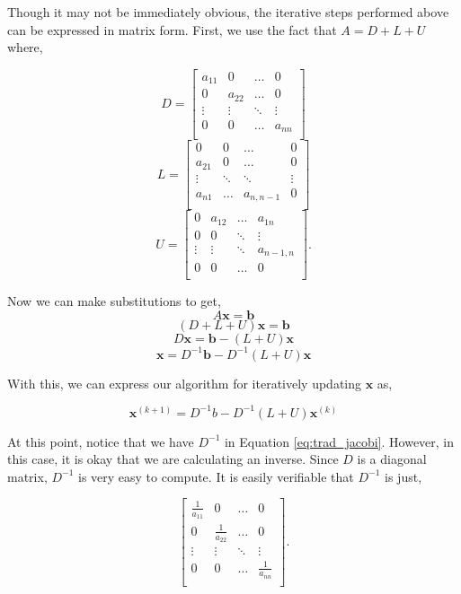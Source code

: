 Though it may not be immediately obvious, the iterative steps performed above
can be expressed in matrix form. First, we use the fact that
$A = D + L + U$ where,

$$
D = \begin{bmatrix}
a_{11} & 0 & \ldots & 0 \\
0 & a_{22} & \ldots & 0 \\
 \vdots & \vdots & \ddots & \vdots \\
0 & 0 & \ldots & a_{nn} \\
\end{bmatrix}
$$
$$
L = \begin{bmatrix}
0 & 0 & \ldots & 0 \\
a_{21} &  0 & \ldots & 0\\
 \vdots & \ddots & \ddots & \vdots \\
a_{n1} & \ldots & a_{n,n-1} & 0 \\
\end{bmatrix}
$$
$$
U = \begin{bmatrix}
0 & a_{12} & \ldots & a_{1n} \\
0 & 0 & \ddots & \vdots \\
 \vdots & \vdots & \ddots & a_{n-1,n} \\
0 & 0 & \ldots & 0 \\
\end{bmatrix}.
$$

Now we can make substitutions to get,
$$ A\mathbf{x} = \mathbf{b} $$
$$ (D + L + U)\mathbf{x} = \mathbf{b} $$
$$ D\mathbf{x} = \mathbf{b} - (L+U)\mathbf{x} $$
$$ \mathbf{x} = D^{-1}\mathbf{b} - D^{-1}(L+U)\mathbf{x} $$

With this, we can express our algorithm for iteratively updating $\mathbf{x}$ as,

\begin{equation} \label{eq:trad_jacobi}
\mathbf{x}^{(k+1)} = D^{-1}b - D^{-1}(L+U)\mathbf{x}^{(k)}
\end{equation}

At this point, notice that we have $D^{-1}$ in Equation \ref{eq:trad_jacobi}. However, in
this case, it is okay that we are calculating an inverse. Since $D$ is a diagonal
matrix, $D^{-1}$ is very easy to compute. It is easily verifiable that $D^{-1}$
is just,

$$
\begin{bmatrix}
\frac{1}{a_{11}} & 0 & \ldots & 0 \\
0 & \frac{1}{a_{22}} & \ldots & 0 \\
 \vdots & \vdots & \ddots & \vdots \\
0 & 0 & \ldots & \frac{1}{a_{nn}} \\
\end{bmatrix}.
$$

